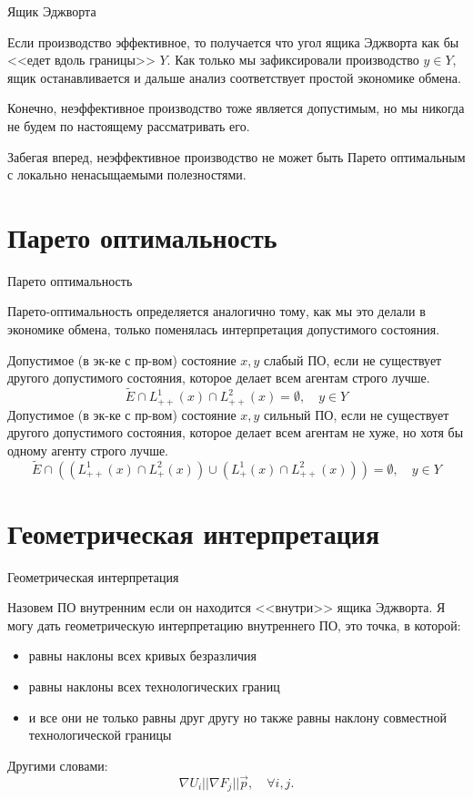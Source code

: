 \documentclass{beamer}
\begin{document}
\begin{frame}{Ящик Эджворта}

Если производство эффективное, то получается что угол ящика Эджворта как бы <<едет вдоль границы>> $Y$. Как только мы зафиксировали производство $y \in Y$, ящик останавливается и дальше анализ соответствует простой экономике обмена.

Конечно, неэффективное производство тоже является допустимым, но мы никогда не будем по настоящему рассматривать его.

Забегая вперед, неэффективное производство не может быть Парето оптимальным с локально ненасыщаемыми полезностями.

\end{frame}

\section{Парето оптимальность}

\begin{frame}{Парето оптимальность}

Парето-оптимальность определяется аналогично тому, как мы это делали в экономике обмена, только поменялась интерпретация допустимого состояния.

Допустимое (в эк-ке с пр-вом) состояние $x,y$ \alert{слабый ПО}, если не существует другого допустимого состояния, которое делает всем агентам строго лучше.
$$ \tilde E \cap L^1_{++}(x) \cap L^2_{++}(x) = \emptyset, \quad y \in Y$$
Допустимое (в эк-ке с пр-вом) состояние $x,y$ \alert{сильный ПО}, если не существует другого допустимого состояния, которое делает всем агентам не хуже, но хотя бы одному агенту строго лучше.
$$ \tilde E \cap ((L^1_{++}(x) \cap L^2_{+}(x)) \cup (L^1_{+}(x) \cap L^2_{++}(x))) = \emptyset, \quad y \in Y$$

\end{frame}

\section{Геометрическая интерпретация}

\begin{frame}{Геометрическая интерпретация}

Назовем ПО \alert{внутренним} если он находится <<внутри>> ящика Эджворта. Я могу дать геометрическую интерпретацию внутреннего ПО, это точка, в которой:
\begin{itemize}
  \item равны наклоны всех кривых безразличия
  \item равны наклоны всех технологических границ
  \item и все они не только равны друг другу но также равны наклону совместной технологической границы
\end{itemize}

Другими словами:
$$ \nabla U_i || \nabla F_j || \vec p, \quad \forall i,j.$$ 

\end{frame}
\end{document}
